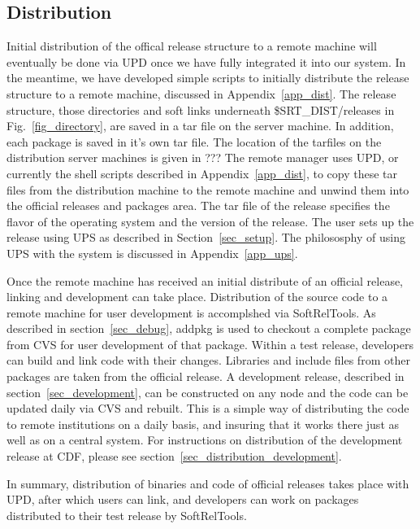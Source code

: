\documentclass[12pt]{article}
\begin{document}
\subsection{Distribution}
Initial distribution of the offical release structure to a remote machine will 
eventually be done via UPD once we have fully integrated it into our system.
In the meantime, we have developed simple scripts to 
initially distribute the release structure to a remote machine, 
discussed in Appendix~\ref{app_dist}.  
The release structure, those directories and soft links underneath
\$SRT\_DIST/releases in Fig.~\ref{fig_directory}, are saved in a tar file on the
server machine.  
In addition, each package  is saved in it's own tar file. 
The location of the tarfiles on the distribution server 
machines is given in ???
The
remote manager uses UPD, or currently the shell scripts described in 
Appendix~\ref{app_dist}, to copy these tar files from the distribution machine
to the remote machine and unwind them into the official 
releases  and packages 
area.  The tar file of the release specifies the flavor of the operating system and 
the version of the release. The user sets up the release using UPS as 
described in Section~\ref{sec_setup}.  The philososphy of using UPS with the
system is discussed in Appendix~\ref{app_ups}.

Once the remote machine has received an initial distribute of an official 
release, linking and development can take place. 
Distribution of the source code to a remote machine for user development is
accomplshed via SoftRelTools.  As described in section~\ref{sec_debug}, 
addpkg 
is used to checkout a complete package from CVS for user development 
of that package. Within a test release, developers can
build and link code with their changes.  Libraries and include files from
other packages are taken from the official release. A development
release, described in section~\ref{sec_development}, can be constructed on 
any node and the code can be updated daily via CVS and rebuilt.  This is a
simple way of distributing the code to remote institutions on a daily basis,
and insuring that it works there just as well as on a central system. For
instructions on distribution of the development release at CDF, please see
section~\ref{sec_distribution_development}.

In summary, distribution of binaries and code of official 
releases takes place 
with UPD, after which users can link, and developers can work 
on packages  distributed to their test release by SoftRelTools.
\end{document}
